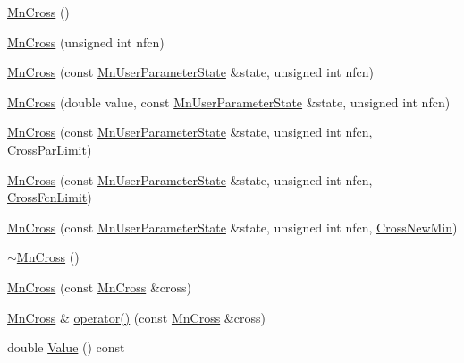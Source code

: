 \begin{DoxyCompactItemize}
\mbox{\hyperlink{classROOT_1_1Minuit2_1_1MnCross_a34d52c2c171319eb9f25c688ab8021f0}{Mn\+Cross}} ()
\item 
\mbox{\hyperlink{classROOT_1_1Minuit2_1_1MnCross_a7f93187035c85b5c2adf78d00c0d0052}{Mn\+Cross}} (unsigned int nfcn)
\item 
\mbox{\hyperlink{classROOT_1_1Minuit2_1_1MnCross_acbfb3f4507d15112537609f68ad36c29}{Mn\+Cross}} (const \mbox{\hyperlink{classROOT_1_1Minuit2_1_1MnUserParameterState}{Mn\+User\+Parameter\+State}} \&state, unsigned int nfcn)
\item 
\mbox{\hyperlink{classROOT_1_1Minuit2_1_1MnCross_a4b4c9d92105b2517789094d86eecee57}{Mn\+Cross}} (double value, const \mbox{\hyperlink{classROOT_1_1Minuit2_1_1MnUserParameterState}{Mn\+User\+Parameter\+State}} \&state, unsigned int nfcn)
\item 
\mbox{\hyperlink{classROOT_1_1Minuit2_1_1MnCross_aea436e84ebb882f376cfdc90b8846660}{Mn\+Cross}} (const \mbox{\hyperlink{classROOT_1_1Minuit2_1_1MnUserParameterState}{Mn\+User\+Parameter\+State}} \&state, unsigned int nfcn, \mbox{\hyperlink{classROOT_1_1Minuit2_1_1MnCross_1_1CrossParLimit}{Cross\+Par\+Limit}})
\item 
\mbox{\hyperlink{classROOT_1_1Minuit2_1_1MnCross_ad306883aae64c6bd2d4acd8adbb28c9e}{Mn\+Cross}} (const \mbox{\hyperlink{classROOT_1_1Minuit2_1_1MnUserParameterState}{Mn\+User\+Parameter\+State}} \&state, unsigned int nfcn, \mbox{\hyperlink{classROOT_1_1Minuit2_1_1MnCross_1_1CrossFcnLimit}{Cross\+Fcn\+Limit}})
\item 
\mbox{\hyperlink{classROOT_1_1Minuit2_1_1MnCross_a8508fcf20167952cb8f53427d348e2dc}{Mn\+Cross}} (const \mbox{\hyperlink{classROOT_1_1Minuit2_1_1MnUserParameterState}{Mn\+User\+Parameter\+State}} \&state, unsigned int nfcn, \mbox{\hyperlink{classROOT_1_1Minuit2_1_1MnCross_1_1CrossNewMin}{Cross\+New\+Min}})
\item 
\mbox{\hyperlink{classROOT_1_1Minuit2_1_1MnCross_a34f9825f828387bc92e6e7aaac8ced84}{$\sim$\+Mn\+Cross}} ()
\item 
\mbox{\hyperlink{classROOT_1_1Minuit2_1_1MnCross_ac4526685d7655e69378fd2cc844d0e55}{Mn\+Cross}} (const \mbox{\hyperlink{classROOT_1_1Minuit2_1_1MnCross}{Mn\+Cross}} \&cross)
\item 
\mbox{\hyperlink{classROOT_1_1Minuit2_1_1MnCross}{Mn\+Cross}} \& \mbox{\hyperlink{classROOT_1_1Minuit2_1_1MnCross_a12f4058d5a3b758cbaa68a0a9bc0cebb}{operator()}} (const \mbox{\hyperlink{classROOT_1_1Minuit2_1_1MnCross}{Mn\+Cross}} \&cross)
\item 
double \mbox{\hyperlink{classROOT_1_1Minuit2_1_1MnCross_af7cebab3edb3fedaf0e4ce0704e1196f}{Value}} () const

\end{DoxyCompactItemize}
